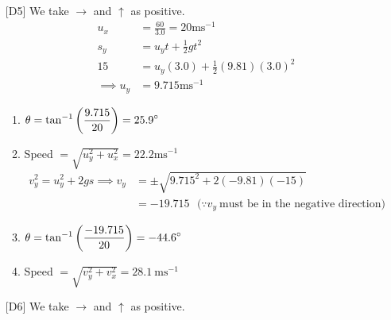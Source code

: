 \documentclass[11pt]{article}
\begin{document}
\begin{enumerate}
			Given the same time of flight, the range is determined by how fast the ball is going horizontally, since the faster you go, the more distance you can cover within the same timeframe.
			\begin{multicols}{4}
				\begin{enumerate}		
					\item $a=b=c$
					\item $a=b=c$
					\item $a < b < c$
					\item $a < b < c$
				\end{enumerate}
			\end{multicols}
		
		\item[{[D5]}] We take $\rightarrow$ and $\uparrow$ as positive.
		\begin{align*}
			u_x &= \frac{60}{3.0} = 20 \text{ms}^{-1} \\
			s_y &= u_yt+\frac{1}{2}gt^2 \\
			15 &= u_y(3.0) + \frac{1}{2}(9.81)(3.0)^2 \\
			\implies u_y &= 9.715 \text{ms}^{-1}
		\end{align*}
		\begin{enumerate}
			\item $\displaystyle \theta = \tan^{-1}\left(\frac{9.715}{20}\right)=25.9 \degree$
			\item Speed $=\sqrt{u_y^2+u_x^2}=22.2\text{ms}^{-1}$
			\begin{align*}
				v_y^2=u_y^2+2gs \implies v_y &= \pm \sqrt{9.715^2+2(-9.81)(-15)} \\
				&=-19.715 ~~~\text{(}\because v_y ~\text{must be in the negative direction)}
			\end{align*}
			\item $\displaystyle \theta = \tan^{-1}\left(\frac{-19.715}{20}\right)=-44.6 \degree$
			\begin{figure}[h]
				\centering
				\def\svgwidth{3.5cm}
				
			\end{figure}
			\item Speed $=\sqrt{v_y^2+v_x^2}=28.1~\text{ms}^{-1}$
		\end{enumerate}
		\pagebreak
		
		\item[{[D6]}] We take $\rightarrow$ and $\uparrow$ as positive.
		

\end{enumerate}
\end{document}
